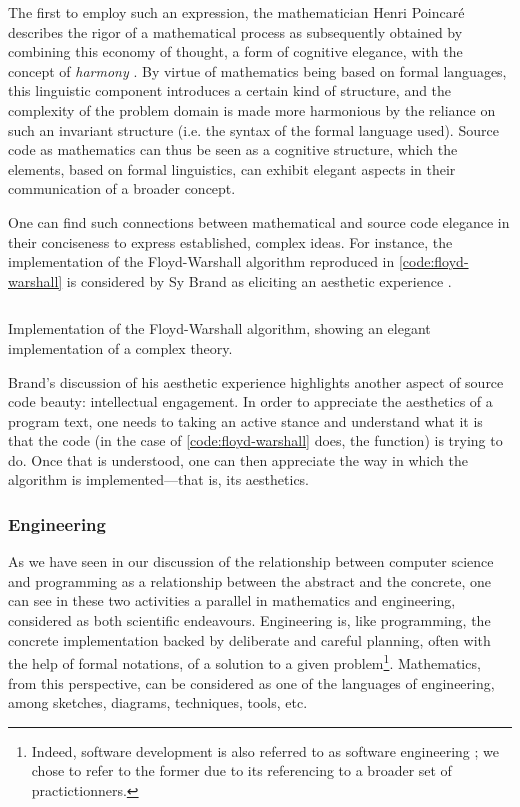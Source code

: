 The first to employ such an expression, the mathematician Henri Poincaré describes the rigor of a mathematical process as subsequently obtained by combining this economy of thought, a form of cognitive elegance, with the concept of \emph{harmony} \citep{poincare_science_1908}. By virtue of mathematics being based on formal languages, this linguistic component introduces a certain kind of structure, and the complexity of the problem domain is made more harmonious by the reliance on such an invariant structure (i.e. the syntax of the formal language used). Source code as mathematics can thus be seen as a cognitive structure, which the elements, based on formal linguistics, can exhibit elegant aspects in their communication of a broader concept.

One can find such connections between mathematical and source code elegance in their conciseness to express established, complex ideas. For instance, the implementation of the Floyd-Warshall algorithm reproduced in \ref{code:floyd-warshall} is considered by Sy Brand as eliciting an aesthetic experience \citep{cpppconference_keynote_2022}.

\begin{listing}
  \inputminted{perl}{./corpus/floyd_warshall.cpp}
  \caption{Implementation of the Floyd-Warshall algorithm, showing an elegant implementation of a complex theory.}
  \label{code:floyd-warshall}
\end{listing}

Brand's discussion of his aesthetic experience highlights another aspect of source code beauty: intellectual engagement. In order to appreciate the aesthetics of a program text, one needs to taking an active stance and understand what it is that the code (in the case of \ref{code:floyd-warshall} does, the function) is trying to do. Once that is understood, one can then appreciate the way in which the algorithm is implemented—that is, its aesthetics.

\subsubsection{Engineering}
\label{subsubsec:beauty-engineering}

As we have seen in our discussion of the relationship between computer science and programming as a relationship between the abstract and the concrete, one can see in these two activities a parallel in mathematics and engineering, considered as both scientific endeavours. Engineering is, like programming, the concrete implementation backed by deliberate and careful planning, often with the help of formal notations, of a solution to a given problem\footnote{Indeed, software development is also referred to as software engineering \citep{bourque_swebok_2014}; we chose to refer to the former due to its referencing to a broader set of practictionners.}. Mathematics, from this perspective, can be considered as one of the languages of engineering, among sketches, diagrams, techniques, tools, etc.

